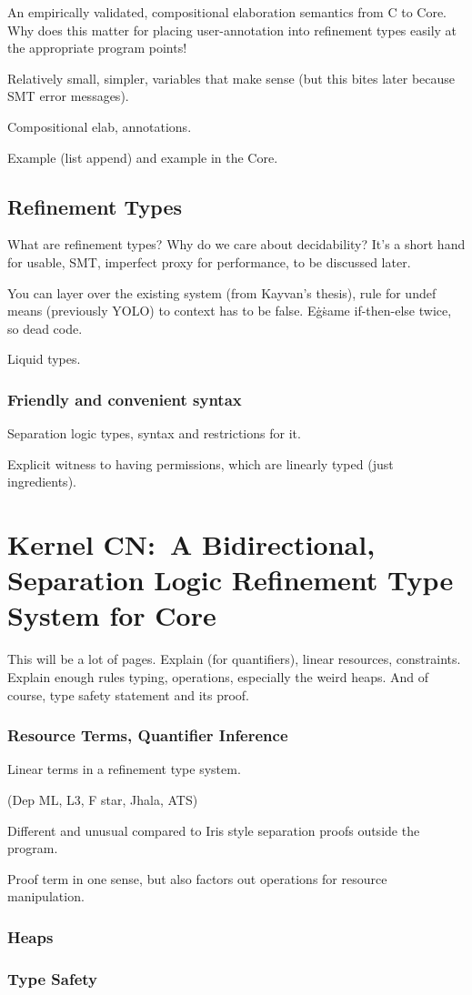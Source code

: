 An empirically validated, compositional elaboration semantics from C to Core.
Why does this matter \textemdash{} for placing user-annotation into refinement types
easily at the appropriate program points!

Relatively small, simpler, variables that make sense (but this bites later because SMT error messages).

Compositional elab, annotations.

Example (list append) and example in the Core.

\section{Refinement Types}

What are refinement types? Why do we care about decidability? It's a short hand
for usable, SMT, imperfect proxy for performance, to be discussed later.

You can layer over the existing system (from Kayvan's thesis), \textendash{}
rule for undef means (previously YOLO) to context has to be false. E\.g\. same if-then-else twice, so dead code.

Liquid types.

\subsection{Friendly and convenient syntax}\label{sec:friendly-syntax}
Separation logic types, syntax and restrictions for it.

Explicit witness to having permissions, which are linearly typed (just ingredients).

\chapter{Kernel CN:\ A Bidirectional, Separation Logic Refinement Type System for Core}%
\label{chap:kernel-cn}

This will be a lot of pages.
Explain  (for quantifiers), linear resources, constraints.
Explain enough rules \textemdash{} typing, operations, especially the weird heaps.
And of course, type safety statement and its proof.

\subsection{Resource Terms, Quantifier Inference}

Linear terms in a refinement type system.

(Dep ML, L3, F star, Jhala, ATS)

Different and unusual compared to Iris style \textemdash{} separation proofs outside the program.

Proof term in one sense, but also factors out operations for resource manipulation.

\subsection{Heaps}


\subsection{Type Safety}

